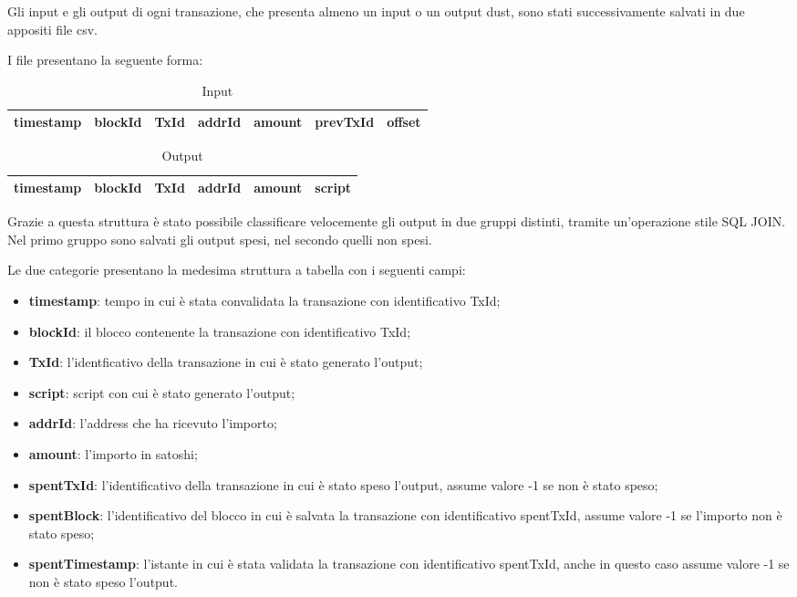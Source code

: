 Gli input e gli output di ogni transazione, che presenta almeno un input o un output dust, sono stati successivamente salvati in due appositi file csv.

I file presentano la seguente forma:
\begin{table}[h!]
\centering
\begin{tabular}{|r|r|r|r|r|r|r|}
\toprule
 timestamp &  blockId &   TxId &  addrId &     amount &  prevTxId &  offset \\
\bottomrule
\end{tabular}
\caption{Input}
\label{table: input}
\end{table}

\begin{table}[h!]
\centering
\begin{tabular}{|r|r|r|r|r|r|}
\toprule
 timestamp &  blockId &   TxId &  addrId &     amount &  script \\
\bottomrule
\end{tabular}
\caption{Output}
\label{table: output}
\end{table}
Grazie a questa struttura è stato possibile classificare velocemente gli output in due gruppi distinti, tramite un'operazione stile SQL JOIN. Nel primo gruppo sono salvati gli output spesi, nel secondo quelli non spesi. 

Le due categorie presentano la medesima struttura a tabella con i seguenti campi:
\begin{itemize}
    \item \textbf{timestamp}: tempo in cui è stata convalidata la transazione con identificativo TxId;  
    \item \textbf{blockId}: il blocco contenente la transazione con identificativo TxId;   
    \item \textbf{TxId}: l'identficativo della transazione in cui è stato generato l'output;
    \item \textbf{script}: script con cui è stato generato l'output;
    \item \textbf{addrId}: l'address che ha ricevuto l'importo;
    \item \textbf{amount}: l'importo in satoshi;
    \item \textbf{spentTxId}: l'identificativo della transazione in cui è stato speso l'output, assume valore -1 se non è stato speso;
    \item \textbf{spentBlock}: l'identificativo del blocco in cui è salvata la transazione con identificativo spentTxId, assume valore -1 se l'importo non è stato speso;
    \item \textbf{spentTimestamp}: l'istante in cui è stata validata la transazione con identificativo spentTxId, anche in questo caso assume valore -1 se non è stato speso l'output.
\end{itemize}

